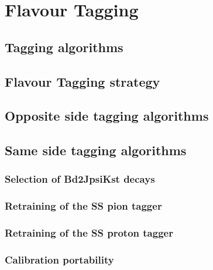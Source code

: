 \chapter{Flavour Tagging}

\blindtext

\section{Tagging algorithms}

\Blindtext

\section{Flavour Tagging strategy}

\Blindtext

\section{Opposite side tagging algorithms}

\Blindtext

\section{Same side tagging algorithms}

\blindtext

\subsection{Selection of Bd2JpsiKst decays}

\Blindtext

\subsection{Retraining of the SS pion tagger}

\Blindtext

\subsection{Retraining of the SS proton tagger}

\Blindtext

\subsection{Calibration portability}
